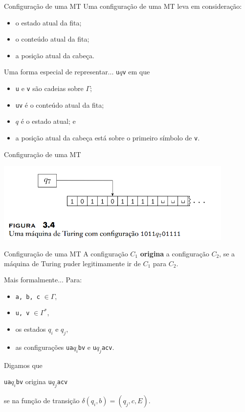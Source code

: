 \documentclass[xcolor=dvipsnames,table]{beamer}
\begin{document}
	\begin{frame}{Configuração de uma MT}
		Uma configuração de uma MT leva em consideração:
		\begin{itemize}
			\item o estado atual da fita;
			\item o conteúdo atual da fita;
			\item a posição atual da cabeça.
		\end{itemize}\pause
		\begin{block}{Uma forma especial de representar...}
			{\tt u}$q${\tt v} em que
			\begin{itemize}
				\item {\tt u} e {\tt v} são cadeias sobre $\Gamma$;
				\item {\tt uv} é o conteúdo atual da fita;
				\item $q$ é o estado atual; e
				\item a posição atual da cabeça está sobre o primeiro símbolo de {\tt v}.
			\end{itemize}
		\end{block}
	\end{frame}	
	
	\begin{frame}{Configuração de uma MT}
		\begin{center}
			\includegraphics[height=4cm]{images/fig34.png}
		\end{center}
	\end{frame}
	
	\begin{frame}{Configuração de uma MT}
		A configuração $C_1$ {\bf origina} a configuração $C_2$, se a máquina de Turing puder legitimamente ir de $C_1$ para $C_2$.
		\begin{block}{Mais formalmente...}					Para:
			\begin{itemize}
				\item {\tt a, b, c} $\in \Gamma$,
				\item {\tt u, v} $\in \Gamma^*$, 
				\item os estados $q_i$ e $q_j$, 
				\item as configurações {\tt ua}$q_i${\tt bv} e {\tt u}$q_j${\tt acv}.
			\end{itemize}
			\pause	
			Digamos que 
			\begin{center}
				{\tt ua}$q_i${\tt bv} origina {\tt u}$q_j${\tt acv} 
			\end{center} 
			se na função de transição $\delta(q_i, b) = (q_j, c, E)$.
		\end{block}
	\end{frame}
	
\end{document}
